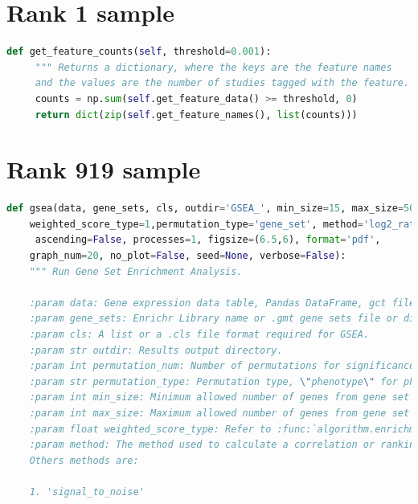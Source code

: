 \documentclass{article}
\begin{document}
\begin{appendices}


\section{Rank 1 sample}
\label{appendix:good}
\begin{lstlisting}[language=Python, caption={Sample that ranked first},captionpos=b]
def get_feature_counts(self, threshold=0.001):
     """ Returns a dictionary, where the keys are the feature names
     and the values are the number of studies tagged with the feature. """
     counts = np.sum(self.get_feature_data() >= threshold, 0)
     return dict(zip(self.get_feature_names(), list(counts)))
\end{lstlisting}

\section{Rank 919 sample}
\label{appendix:bad}
\begin{lstlisting}[language=Python, caption={Sample that ranked first},captionpos=b]
def gsea(data, gene_sets, cls, outdir='GSEA_', min_size=15, max_size=500, permutation_num=1000,
    weighted_score_type=1,permutation_type='gene_set', method='log2_ratio_of_classes',
     ascending=False, processes=1, figsize=(6.5,6), format='pdf',
    graph_num=20, no_plot=False, seed=None, verbose=False):
    """ Run Gene Set Enrichment Analysis.
    
    :param data: Gene expression data table, Pandas DataFrame, gct file.
    :param gene_sets: Enrichr Library name or .gmt gene sets file or dict of gene sets. Same input with GSEA.
    :param cls: A list or a .cls file format required for GSEA.
    :param str outdir: Results output directory.
    :param int permutation_num: Number of permutations for significance computation. Default: 1000.
    :param str permutation_type: Permutation type, \"phenotype\" for phenotypes, \"gene_set\" for genes.
    :param int min_size: Minimum allowed number of genes from gene set also the data set. Default: 15.
    :param int max_size: Maximum allowed number of genes from gene set also the data set. Default: 500.
    :param float weighted_score_type: Refer to :func:`algorithm.enrichment_score`. Default:1.
    :param method: The method used to calculate a correlation or ranking. Default: 'log2_ratio_of_classes'.
    Others methods are:
    
    1. 'signal_to_noise'
    

\end{lstlisting}
\end{appendices}
\end{document}

